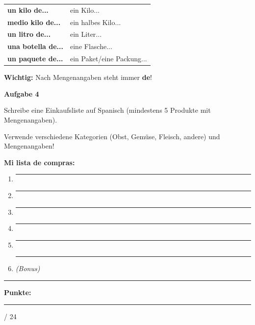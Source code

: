 \documentclass[11pt, a4paper]{article}
\newcommand{\fachfarbe}{spanisch}
\newcommand{\maxpunkte}{24}
\newcommand{\punktebox}[1]{\hfill\fbox{\small \_/#1}}
\newcommand{\luecke}[1]{\rule{#1}{0.4pt}}
\newcommand{\es}[1]{\textcolor{\fachfarbe}{\textbf{#1}}}
\newenvironment{aufgabe}[1]{%
    \needspace{5\baselineskip}%
    \nopagebreak[4]%
    \vspace{10pt}
    \noindent\textbf{\textcolor{\fachfarbe}{Aufgabe #1}}
    \nopagebreak[4]%
    \vspace{5pt}
    \nopagebreak[4]%
    \begin{list}{}{\leftmargin=0pt}
    \item[]
}{%
    \end{list}
}
\begin{document}
\vspace{15pt}


\begin{merkkasten}

\begin{tabular}{ll}
\es{un kilo de...} & ein Kilo... \\
\es{medio kilo de...} & ein halbes Kilo... \\
\es{un litro de...} & ein Liter... \\
\es{una botella de...} & eine Flasche... \\
\es{un paquete de...} & ein Paket/eine Packung... \\
\end{tabular}

\vspace{0.5em}
\textbf{Wichtig:} Nach Mengenangaben steht immer \es{de}!
\end{merkkasten}

\vspace{15pt}


\begin{aufgabe}{4}
Schreibe eine Einkaufsliste auf Spanisch (mindestens 5 Produkte mit Mengenangaben). \punktebox{8}
\end{aufgabe}

\begin{hinweis}
Verwende verschiedene Kategorien (Obst, Gemüse, Fleisch, andere) und Mengenangaben!
\end{hinweis}

\vspace{0.5em}

\noindent\textbf{Mi lista de compras:}

\begin{enumerate}
    \item \luecke{8cm}
    \item \luecke{8cm}
    \item \luecke{8cm}
    \item \luecke{8cm}
    \item \luecke{8cm}
    \item \luecke{8cm} \textit{(Bonus)}
\end{enumerate}

\vspace{20pt}
\hrule
\vspace{10pt}

\begin{flushright}
\textbf{Punkte:} \luecke{1cm} / \maxpunkte
\end{flushright}
\end{document}
